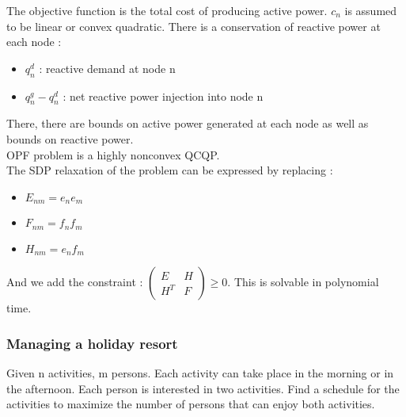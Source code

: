 \documentclass[../main.tex]{subfiles}
\begin{document}
The objective function is the total cost of producing active power. $c_n$ is assumed to be linear or convex quadratic. There is a conservation of reactive power at each node : \begin{itemize}
    \item $q_n^d$ : reactive demand at node n
    \item $q_n^g - q_n^d$ : net reactive power injection into node n
\end{itemize}
There, there are bounds on active power generated at each node as well as bounds on reactive power.\\
\warning OPF problem is a highly nonconvex QCQP.\\
The SDP relaxation of the problem can be expressed by replacing : \begin{itemize}
    \item $E_{nm} = e_n e_m$
    \item $F_{nm} = f_nf_m$
    \item $H_{nm} = e_n f_m$
\end{itemize}
And we add the constraint : $\begin{pmatrix}
    E & H \\ H^T & F
\end{pmatrix} \geq 0$. This is solvable in polynomial time.\\

\subsubsection{Managing a holiday resort}
Given n activities, m persons. Each activity can take place in the morning or in the afternoon. Each person is interested in two activities. Find a schedule for the activities to maximize the number of persons that can enjoy both activities.\\
\end{document}

